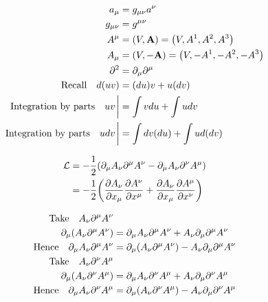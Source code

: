 \documentclass[letterpaper]{article}
\theoremstyle{definition}
\begin{document}
\begin{align*}
  a_\mu                               & =g_{\mu\nu}a^\nu                          \\
  g_{\mu\nu}                          & =g^{\mu\nu}                               \\
  A^\mu                               & =\pqty{V,\vb{A}}=\pqty{V,A^1,A^2,A^3}     \\
  A_\mu                               & =\pqty{V,-\vb{A}}=\pqty{V,-A^1,-A^2,-A^3} \\
  \partial^2                          & =\partial_\mu \partial^\mu                \\
  \qq*{Recall} d (uv)                 & =  (du)v +  u (dv)                        \\
  \qq*{Integration by parts} uv\eval  & =\int  v du + \int u dv                   \\
  \qq*{Integration by parts} udv\eval & =\int dv (du) + \int u d(dv)              \\
\end{align*}

\begin{align*}
  \mathcal{L} & =-\frac{1}{2}\pqty{\partial_\mu A_\nu \partial^\mu A^\nu -\partial_\mu A_\nu \partial^\nu A^\mu} \\
              & =-\frac{1}{2}\pqty{\pdv{A_\nu}{x_\mu}\pdv{A^\nu}{x^\mu}+\pdv{A_\nu}{x_\mu}\pdv{A^\mu}{x^\nu}  }  \\
\end{align*}

\begin{align*}
  \qq*{Take}A_\nu \partial^\mu A^\nu               &                                                                                  \\
  \partial_\mu (A_\nu \partial^\mu A^\nu)          & =\partial_\mu A_\nu \partial^\mu A^\nu + A_\nu \partial_\mu\partial^\mu A^\nu    \\
  \qq*{Hence}\partial_\mu A_\nu \partial^\mu A^\nu & = \partial_\mu (A_\nu \partial^\mu A^\nu) - A_\nu \partial_\mu\partial^\mu A^\nu \\
  \qq*{Take}A_\nu \partial^\nu A^\mu               &                                                                                  \\
  \partial_\mu (A_\nu \partial^\nu A^\mu)          & =\partial_\mu A_\nu \partial^\nu A^\mu + A_\nu \partial_\mu\partial^\nu A^\mu    \\
  \qq*{Hence}\partial_\mu A_\nu \partial^\nu A^\mu & =\partial_\mu (A_\nu \partial^\nu A^\mu) - A_\nu \partial_\mu\partial^\nu A^\mu  \\
\end{align*}
\end{document}
